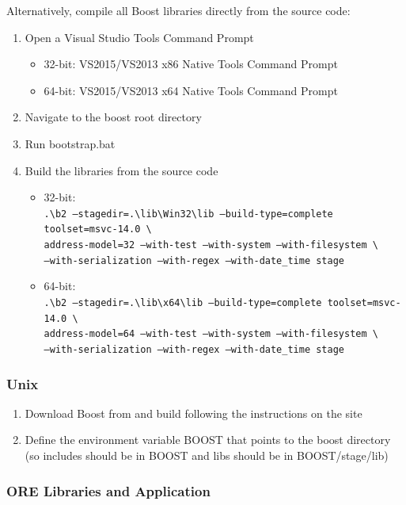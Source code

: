 \documentclass[12pt, a4paper]{article}
\newcommand{\bs}{\textbackslash}
\begin{document}
Alternatively, compile all Boost libraries directly from the source code:

\begin{enumerate}
\item Open a Visual Studio Tools Command Prompt
\begin{itemize}
\item 32-bit: VS2015/VS2013 x86 Native Tools Command Prompt
\item 64-bit: VS2015/VS2013 x64 Native Tools Command Prompt
\end{itemize}
\item Navigate to the boost root directory
\item Run bootstrap.bat
\item Build the libraries from the source code
\begin{itemize}
\item 32-bit: \\
  {\footnotesize\tt .{\bs}b2 --stagedir=.{\bs}lib{\bs}Win32{\bs}lib --build-type=complete toolset=msvc-14.0 \bs \\
    address-model=32 --with-test --with-system --with-filesystem  \bs \\
    --with-serialization --with-regex --with-date\_time stage}
\item 64-bit: \\
  {\footnotesize\tt .{\bs}b2 --stagedir=.{\bs}lib{\bs}x64{\bs}lib --build-type=complete toolset=msvc-14.0 \bs \\
    address-model=64 --with-test --with-system --with-filesystem \bs \\
    --with-serialization --with-regex --with-date\_time stage}
\end{itemize}
\end{enumerate}

\subsubsection*{Unix}

\begin{enumerate}
\item Download Boost from \cite{boost} and build following the instructions on the site
\item Define the environment variable BOOST that points to the boost directory
(so includes should be in BOOST and libs should be in BOOST/stage/lib)
\end{enumerate}

\subsubsection{ORE Libraries and Application}\label{sec:build}
\end{document}
